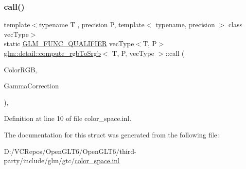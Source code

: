 \subsubsection{\texorpdfstring{call()}{call()}}
{\footnotesize\ttfamily template$<$typename T , precision P, template$<$ typename, precision $>$ class vec\+Type$>$ \\
static \mbox{\hyperlink{setup_8hpp_a33fdea6f91c5f834105f7415e2a64407}{G\+L\+M\+\_\+\+F\+U\+N\+C\+\_\+\+Q\+U\+A\+L\+I\+F\+I\+ER}} vec\+Type$<$T, P$>$ \mbox{\hyperlink{structglm_1_1detail_1_1compute__rgb_to_srgb}{glm\+::detail\+::compute\+\_\+rgb\+To\+Srgb}}$<$ T, P, vec\+Type $>$\+::call (\begin{DoxyParamCaption}\item[{vec\+Type$<$ T, P $>$ const \&}]{Color\+R\+GB,  }\item[{T}]{Gamma\+Correction }\end{DoxyParamCaption})\hspace{0.3cm}{\ttfamily [inline]}, {\ttfamily [static]}}



Definition at line 10 of file color\+\_\+space.\+inl.



The documentation for this struct was generated from the following file\+:\begin{DoxyCompactItemize}
\item 
D\+:/\+V\+C\+Repos/\+Open\+G\+L\+T6/\+Open\+G\+L\+T6/third-\/party/include/glm/gtc/\mbox{\hyperlink{gtc_2color__space_8inl}{color\+\_\+space.\+inl}}\end{DoxyCompactItemize}
